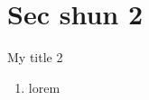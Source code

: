 \documentclass{beamer}
\begin{document}
\section{Sec shun 2}
\begin{frame}{My title 2}
\begin{enumerate}
\item lorem
\end{enumerate}
\end{frame}
\end{document}
